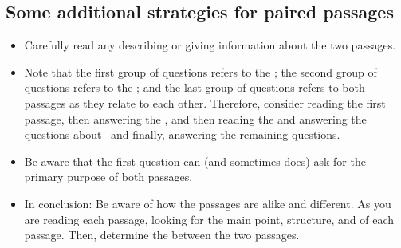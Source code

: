 \subsection{Some additional strategies for paired passages}

\begin{itemize}
\item Carefully read any \longline describing or giving information about the two passages.

\item Note that the first group of questions refers to the \longline; the second group of questions refers to the \longline; and the last group of questions refers to both passages as they relate to each other. Therefore, consider reading the first passage, then answering the \longline, and then reading the \longline and answering the questions about \longline\ and finally, answering the remaining questions.

\item Be aware that the first question can (and sometimes does) ask for the primary purpose of both passages.

\item In conclusion: Be aware of how the passages are alike and different. As you are reading each passage, looking for the main point, structure, and \longline of each passage. Then, determine the \longline between the two passages. 
\end{itemize}